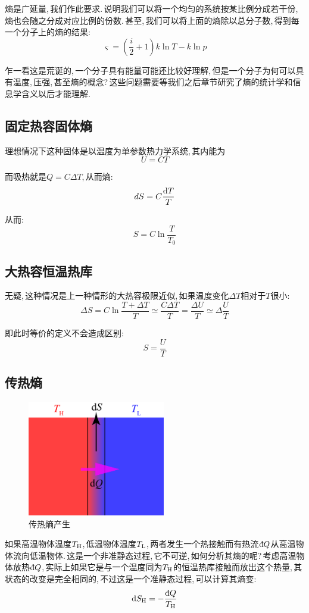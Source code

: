 熵是广延量,\,我们作此要求.\,说明我们可以将一个均匀的系统按某比例分成若干份,\,熵也会随之分成对应比例的份数.\,甚至,\,我们可以将上面的熵除以总分子数,\,得到每一个分子上的熵的结果:
\[\varsigma=\left( \frac{i}{2}+1 \right)k\ln T-k\ln p \]

乍一看这是荒诞的,\,一个分子具有能量可能还比较好理解,\,但是一个分子为何可以具有温度,\,压强,\,甚至熵的概念?\,这些问题需要等我们之后章节研究了熵的统计学和信息学含义以后才能理解.

\subsection{固定热容固体熵}

理想情况下这种固体是以温度为单参数热力学系统,\,其内能为
\[U=CT\]

而吸热就是$Q=C\Delta T$,\,从而熵:
\[dS=C\frac{\textrm{d} T}{T}\]

从而:
\[S=C\ln\frac{T}{T_0}\]

\subsection{大热容恒温热库}

无疑,\,这种情况是上一种情形的大热容极限近似,\,如果温度变化$\Delta T$相对于$T$很小:
\[\Delta S=C\ln\frac{T+\Delta T}{T}\simeq\frac{C\Delta T}{T}=\frac{\Delta U}{T}\simeq\Delta{\frac{U}{T}}\]

即此时等价的定义不会造成区别:
\[S=\frac{U}{T}\]

\subsection{传热熵}

\begin{figure}
\centering
\vspace{-0.5cm}
\includegraphics[width=6cm]{image/5-2-15.png}
\caption{传热熵产生}
\end{figure}
如果高温物体温度$T_{\rm H}$,\,低温物体温度$T_{\rm L}$,\,两者发生一个热接触而有热流$\dbar Q$从高温物体流向低温物体.\,这是一个非准静态过程,\,它不可逆,\,如何分析其熵的呢?\,考虑高温物体放热$\dbar Q$,\,实际上如果它是与一个温度同为$T_{\rm H}$的恒温热库接触而放出这个热量,\,其状态的改变是完全相同的,\,不过这是一个准静态过程,\,可以计算其熵变:
\[\ud S_{\rm H}=-\frac{\dbar Q}{T_{\rm H}}\]

